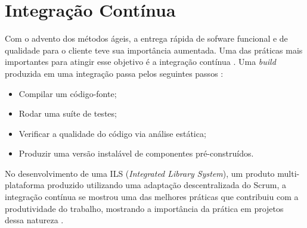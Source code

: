 \section{Integração Contínua}

Com o advento dos métodos ágeis, a entrega rápida de sofware funcional e de qualidade para o cliente teve sua importância aumentada. Uma das práticas mais importantes para atingir esse objetivo é a integração contínua \cite{continuous-integration}. Uma \textit{build} produzida em uma integração passa pelos seguintes passos \cite{continuous-integration}:
\begin{itemize}
\item Compilar um código-fonte;
\item Rodar uma suíte de testes; 
\item Verificar a qualidade do código via análise estática;
\item Produzir uma versão instalável de componentes pré-construídos. 
\end{itemize}

No desenvolvimento de uma ILS (\textit{Integrated Library System}), um produto multi-plataforma produzido utilizando uma adaptação descentralizada do Scrum, a integração contínua se mostrou uma das melhores práticas que contribuiu com a produtividade do trabalho, mostrando a importância da prática em projetos dessa natureza \cite{sutherland}.

